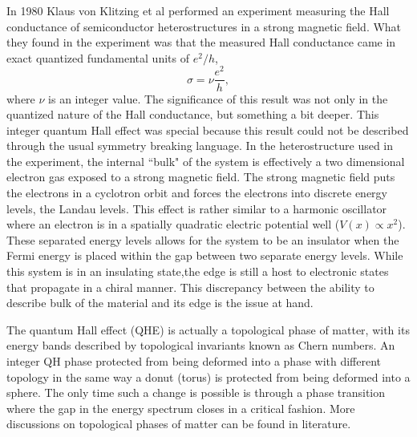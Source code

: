 In 1980 Klaus von Klitzing et al performed an experiment measuring the Hall conductance of semiconductor heterostructures in a strong magnetic field\cite{klitzing_new_1980}. What they found in the experiment was that the measured Hall conductance came in exact quantized fundamental units of $e^2/h$,
\begin{equation}
\sigma = \nu \frac{e^2}{h},
\end{equation} 
where $\nu$ is an integer value. 
The significance of this result was not only in the quantized nature of the Hall conductance, but something a bit deeper. This integer quantum Hall effect was special because this result could not be described through the usual symmetry breaking language. In the heterostructure used in the experiment, the internal ``bulk" of the system is effectively a two dimensional electron gas exposed to a strong magnetic field. The strong magnetic field puts the electrons in a cyclotron orbit and forces the electrons into discrete energy levels, the Landau levels. This effect is rather similar to a harmonic oscillator where an electron is in a spatially quadratic electric potential well ($V(x)\propto x^2$). These separated energy levels allows for the system to be an insulator when the Fermi energy is placed within the gap between two separate energy levels. While this system is in an insulating state,the edge is still a host to electronic states that propagate in a chiral manner. This discrepancy between the ability to describe bulk of the material and its edge is the issue at hand. 

The quantum Hall effect (QHE) is actually a topological phase of matter, with its energy bands described by topological invariants known as Chern numbers.
An integer QH phase protected from being deformed into a phase with different topology in the same way a donut (torus) is protected from being deformed into a sphere. The only time such a change is possible is through a phase transition where the gap in the energy spectrum closes in a critical fashion. 
More discussions on topological phases of matter can be found in literature.

